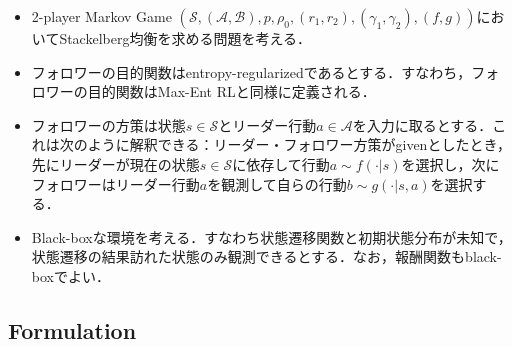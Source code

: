 \documentclass[a4paper,10pt,dvipdfmx]{jsarticle}
\begin{document}
\begin{itemize}
    \item 2-player Markov Game $(\mathcal{S}, (\mathcal{A},\mathcal{B}), p, \rho_0, (r_1,r_2), (\gamma_1,\gamma_2),(f,g))$においてStackelberg均衡を求める問題を考える．
    \item フォロワーの目的関数はentropy-regularizedであるとする．すなわち，フォロワーの目的関数はMax-Ent RLと同様に定義される．
    \item フォロワーの方策は状態$s\in\mathcal{S}$とリーダー行動$a\in\mathcal{A}$を入力に取るとする．これは次のように解釈できる：リーダー・フォロワー方策がgivenとしたとき，先にリーダーが現在の状態$s\in\mathcal{S}$に依存して行動$a\sim f(\cdot|s)$を選択し，次にフォロワーはリーダー行動$a$を観測して自らの行動$b\sim g(\cdot|s,a)$を選択する．
    \item Black-boxな環境を考える．すなわち状態遷移関数と初期状態分布が未知で，状態遷移の結果訪れた状態のみ観測できるとする．なお，報酬関数もblack-boxでよい．
\end{itemize}

\subsection{Formulation}
\end{document}
